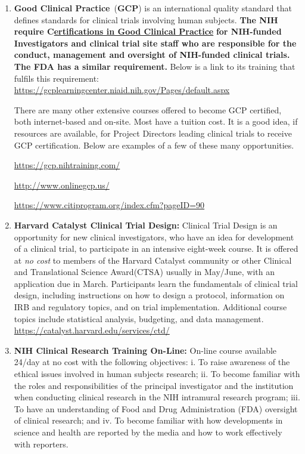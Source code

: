 \documentclass[]{book}
\begin{document}
\begin{enumerate}
\def\labelenumi{\arabic{enumi}.}
\item
  \textbf{Good Clinical Practice}~(\textbf{GCP}) is an international
  quality standard that defines standards for clinical trials involving
  human subjects. \textbf{The NIH require
  C}\href{http://grants.nih.gov/grants/guide/notice-files/NOT-OD-16-148.html\#_ftn2}{\textbf{ertifications
  in Good Clinical Practice}} \textbf{for NIH-funded Investigators and
  clinical trial site staff who are responsible for the conduct,
  management and oversight of NIH-funded clinical trials. The FDA has a
  similar requirement.} Below is a link to its training that fulfils
  this requirement:
  \url{https://gcplearningcenter.niaid.nih.gov/Pages/default.aspx}

  There are many other extensive courses offered to become GCP
  certified, both internet-based and on-site. Most have a tuition cost.
  It is a good idea, if resources are available, for Project Directors
  leading clinical trials to receive GCP certification. Below are
  examples of a few of these many opportunities.

  \url{https://gcp.nihtraining.com/}

  \url{http://www.onlinegcp.us/}

  \url{https://www.citiprogram.org/index.cfm?pageID=90}
\item
  \textbf{Harvard Catalyst Clinical Trial Design:} Clinical Trial Design
  is an opportunity for new clinical investigators, who have an idea for
  development of a clinical trial, to participate in an intensive
  eight-week course. It is offered at \emph{no cost} to members of the
  Harvard Catalyst community or other Clinical and Translational Science
  Award(CTSA) usually in May/June, with an application due in March.
  Participants learn the fundamentals of clinical trial design,
  including instructions on how to design a protocol, information on IRB
  and regulatory topics, and on trial implementation. Additional course
  topics include statistical analysis, budgeting, and data management.
  \url{https://catalyst.harvard.edu/services/ctd/}
\item
  \textbf{NIH Clinical Research Training On-Line:} On-line course
  available 24/day at no cost with the following objectives: i. To raise
  awareness of the ethical issues involved in human subjects research;
  ii. To become familiar with the roles and responsibilities of the
  principal investigator and the institution when conducting clinical
  research in the NIH intramural research program; iii. To have an
  understanding of Food and Drug Administration (FDA) oversight of
  clinical research; and iv. To become familiar with how developments in
  science and health are reported by the media and how to work
  effectively with reporters.


\end{enumerate}
\end{document}
